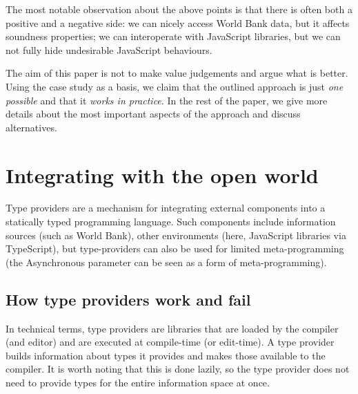 \documentclass[submission,copyright,creativecommons]{eptcs}
\newcommand{\ident}[1]{\textnormal{\sffamily #1}}
\begin{document}
\noindent
The most notable observation about the above points is that there is often both a positive and
a negative side: we can nicely access World Bank data, but it affects soundness properties;
we can interoperate with JavaScript libraries, but we can not fully hide undesirable JavaScript
behaviours.

The aim of this paper is not to make value judgements and argue what is better. Using the case
study as a basis, we claim that the outlined approach is just \emph{one possible} and that it
\emph{works in practice}. In the rest of the paper, we give more details about the most important
aspects of the approach and discuss alternatives.



%


\section{Integrating with the open world}
\label{sec:tp}

Type providers \cite{fsharp-typeprov} are a mechanism for integrating external components into a
statically typed programming language. Such components include information sources (such as World
Bank), other environments (here, JavaScript libraries via TypeScript), but type-providers can
also be used for limited meta-programming (the \ident{Asynchronous} parameter can be seen as
a form of meta-programming).


\subsection{How type providers work and fail}
\label{sec:tp-def}

In technical terms, type providers are libraries that are loaded by the compiler (and editor)
and are executed at compile-time (or edit-time). A type provider builds information about types
it provides and makes those available to the compiler. It is worth noting that this is done lazily,
so the type provider does not need to provide types for the entire information space at once.
\end{document}
